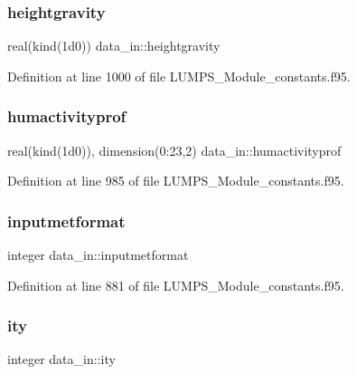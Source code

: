 \subsubsection{\texorpdfstring{heightgravity}{heightgravity}}
{\footnotesize\ttfamily real(kind(1d0)) data\+\_\+in\+::heightgravity}



Definition at line 1000 of file L\+U\+M\+P\+S\+\_\+\+Module\+\_\+constants.\+f95.

\mbox{\label{namespacedata__in_a3cb096487decd1f0cec9c289cba1eae6}} 
\subsubsection{\texorpdfstring{humactivityprof}{humactivityprof}}
{\footnotesize\ttfamily real(kind(1d0)), dimension(0\+:23,2) data\+\_\+in\+::humactivityprof}



Definition at line 985 of file L\+U\+M\+P\+S\+\_\+\+Module\+\_\+constants.\+f95.

\mbox{\label{namespacedata__in_a4abd9462bcbb39b3cab15d64ebe71995}} 
\subsubsection{\texorpdfstring{inputmetformat}{inputmetformat}}
{\footnotesize\ttfamily integer data\+\_\+in\+::inputmetformat}



Definition at line 881 of file L\+U\+M\+P\+S\+\_\+\+Module\+\_\+constants.\+f95.

\mbox{\label{namespacedata__in_a71e2da70dfd1593a6a4770f164bcc146}} 
\subsubsection{\texorpdfstring{ity}{ity}}
{\footnotesize\ttfamily integer data\+\_\+in\+::ity}



